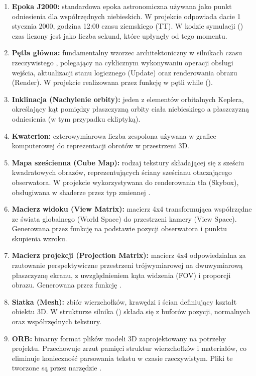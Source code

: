     \begin{enumerate}
        \item \textbf{Epoka J2000:} standardowa epoka astronomiczna używana jako punkt odniesienia dla współrzędnych niebieskich. W projekcie odpowiada dacie 1 stycznia 2000, godzina 12:00 czasu ziemskiego (TT). W kodzie symulacji () czas liczony jest jako liczba sekund, które upłynęły od tego momentu.
        \item \textbf{Pętla główna:} fundamentalny wzorzec architektoniczny w silnikach czasu rzeczywistego \cite{book_gregory_game_engine}, polegający na cyklicznym wykonywaniu operacji obsługi wejścia, aktualizacji stanu logicznego (Update) oraz renderowania obrazu (Render). W projekcie realizowana przez funkcję  w pętli while ().
        \item \textbf{Inklinacja (Nachylenie orbity):}  jeden z elementów orbitalnych Keplera, określający kąt pomiędzy płaszczyzną orbity ciała niebieskiego a płaszczyzną odniesienia (w tym przypadku ekliptyką).
        \item \textbf{Kwaterion:} czterowymiarowa liczba zespolona używana w grafice komputerowej do reprezentacji obrotów w przestrzeni 3D.
        \item \textbf{Mapa sześcienna (Cube Map):} rodzaj tekstury składającej się z sześciu kwadratowych obrazów, reprezentujących ściany sześcianu otaczającego obserwatora. W projekcie wykorzystywana do renderowania tła (Skybox), obsługiwana w shaderze przez typ zmiennej .
        \newpage
        \item \textbf{Macierz widoku (View Matrix):} macierz 4x4 transformująca współrzędne ze świata globalnego (World Space) do przestrzeni kamery (View Space). Generowana przez funkcję  na podstawie pozycji obserwatora i punktu skupienia wzroku.
        \item \textbf{Macierz projekcji (Projection Matrix):} macierz 4x4 odpowiedzialna za rzutowanie perspektywiczne przestrzeni trójwymiarowej na dwuwymiarową płaszczyznę ekranu, z uwzględnieniem kąta widzenia (FOV) i proporcji obrazu. Generowana przez funkcję .
        \item \textbf{Siatka (Mesh):} zbiór wierzchołków, krawędzi i ścian definiujący kształt obiektu 3D. W strukturze silnika () składa się z buforów pozycji, normalnych oraz współrzędnych tekstury.
        \item \textbf{ORB:} binarny format plików modeli 3D zaprojektowany na potrzeby projektu. Przechowuje zrzut pamięci struktur wierzchołków i materiałów, co eliminuje konieczność parsowania tekstu w czasie rzeczywistym. Pliki te tworzone są przez narzędzie .

\end{enumerate}
